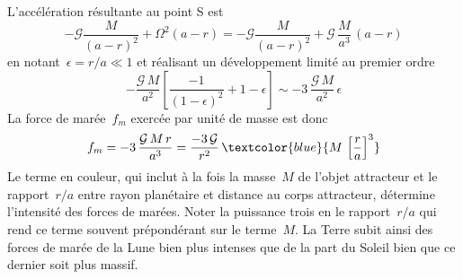 \sk
L'accélération résultante au point S est
\[ -\mathcal{G} \frac{M}{(a-r)^2} + \Omega^2 (a-r) = -\mathcal{G} \frac{M}{(a-r)^2} + \mathcal{G} \, \frac{M}{a^3} \, (a-r) \]
\noindent en notant~$\epsilon = r/a \ll 1$ et réalisant un développement limité au premier ordre
\[ -\frac{\mathcal{G}\,M}{a^2} \left[ \frac{-1}{(1-\epsilon)^2} + 1-\epsilon \right] \sim - 3 \, \frac{\mathcal{G}\,M}{a^2} \,\epsilon \]
La force de marée~$f_m$ exercée par unité de masse est donc
\[ f_m = - 3 \, \frac{\mathcal{G}\,M\,r}{a^3} = \frac{-3\,\mathcal{G}}{r^2} \, \textcolor{blue}{ M \, \left[ \frac{r}{a} \right]^3 } \]
\noindent Le terme en couleur, qui inclut à la fois la masse~$M$ de l'objet attracteur et le rapport~$r/a$ entre rayon planétaire et distance au corps attracteur, détermine l'intensité des forces de marées. Noter la puissance trois en le rapport~$r/a$ qui rend ce terme souvent prépondérant sur le terme~$M$. La Terre subit ainsi des forces de marée de la Lune bien plus intenses que de la part du Soleil bien que ce dernier soit plus massif.
